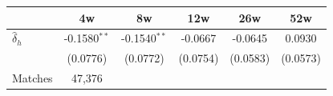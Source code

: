 \begin{tabular}{l*{5}{c}}
\toprule
 & 4w & 8w & 12w & 26w & 52w \\
\midrule
$\hat{\delta}_h$ & -0.1580$^{**}$ & -0.1540$^{**}$ & -0.0667 & -0.0645 & 0.0930 \\
 & (0.0776) & (0.0772) & (0.0754) & (0.0583) & (0.0573) \\
\midrule
Matches & 47,376 \\
\bottomrule
\end{tabular}
